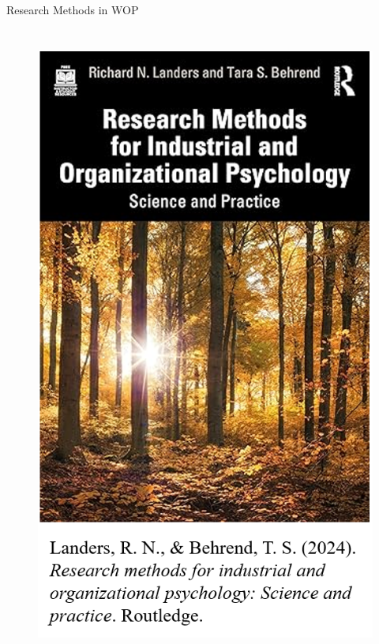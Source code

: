 \documentclass{beamer}
\begin{document}
\begin{frame}{Research Methods in WOP}
\begin{columns}[t]
        \vspace{-1cm} %
        \begin{figure}
                \centering
                \includegraphics[width=1.1\linewidth]{figs/Landers_cover.png}
            \label{fig:Landers}
        \end{figure}
    \end{columns}
\end{frame}
\end{document}
